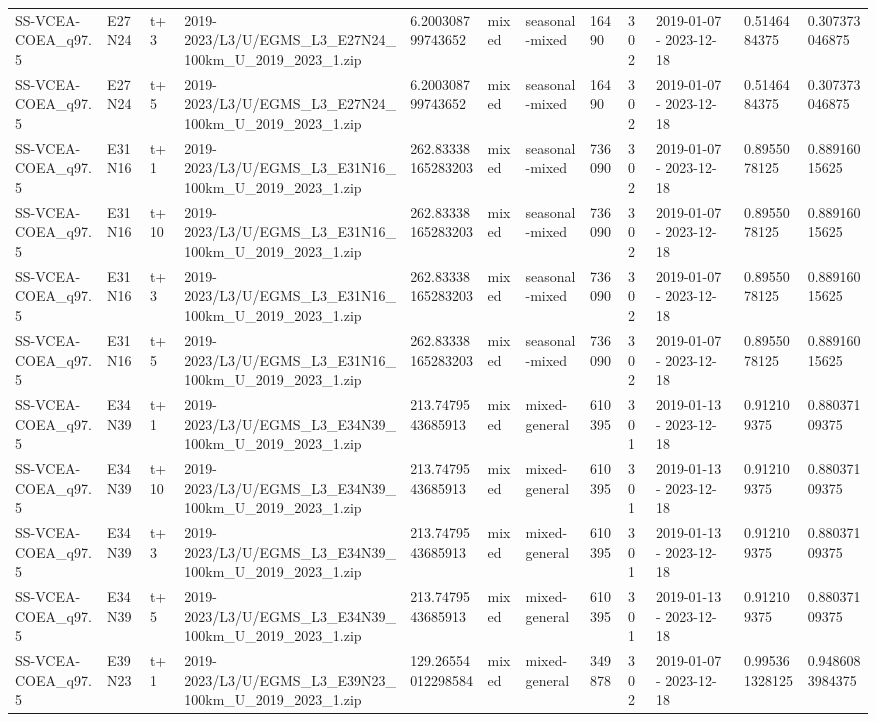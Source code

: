 \begin{landscape}
\begin{longtable}{llllllllllll}
SS-VCEA-COEA\_q97.5 & E27N24 & t+3 & 2019-2023/L3/U/EGMS\_L3\_E27N24\_100km\_U\_2019\_2023\_1.zip & 6.200308799743652 & mixed & seasonal-mixed & 16490 & 302 & 2019-01-07 - 2023-12-18 & 0.5146484375 & 0.307373046875 \\
SS-VCEA-COEA\_q97.5 & E27N24 & t+5 & 2019-2023/L3/U/EGMS\_L3\_E27N24\_100km\_U\_2019\_2023\_1.zip & 6.200308799743652 & mixed & seasonal-mixed & 16490 & 302 & 2019-01-07 - 2023-12-18 & 0.5146484375 & 0.307373046875 \\
SS-VCEA-COEA\_q97.5 & E31N16 & t+1 & 2019-2023/L3/U/EGMS\_L3\_E31N16\_100km\_U\_2019\_2023\_1.zip & 262.83338165283203 & mixed & seasonal-mixed & 736090 & 302 & 2019-01-07 - 2023-12-18 & 0.8955078125 & 0.88916015625 \\
SS-VCEA-COEA\_q97.5 & E31N16 & t+10 & 2019-2023/L3/U/EGMS\_L3\_E31N16\_100km\_U\_2019\_2023\_1.zip & 262.83338165283203 & mixed & seasonal-mixed & 736090 & 302 & 2019-01-07 - 2023-12-18 & 0.8955078125 & 0.88916015625 \\
SS-VCEA-COEA\_q97.5 & E31N16 & t+3 & 2019-2023/L3/U/EGMS\_L3\_E31N16\_100km\_U\_2019\_2023\_1.zip & 262.83338165283203 & mixed & seasonal-mixed & 736090 & 302 & 2019-01-07 - 2023-12-18 & 0.8955078125 & 0.88916015625 \\
SS-VCEA-COEA\_q97.5 & E31N16 & t+5 & 2019-2023/L3/U/EGMS\_L3\_E31N16\_100km\_U\_2019\_2023\_1.zip & 262.83338165283203 & mixed & seasonal-mixed & 736090 & 302 & 2019-01-07 - 2023-12-18 & 0.8955078125 & 0.88916015625 \\
SS-VCEA-COEA\_q97.5 & E34N39 & t+1 & 2019-2023/L3/U/EGMS\_L3\_E34N39\_100km\_U\_2019\_2023\_1.zip & 213.7479543685913 & mixed & mixed-general & 610395 & 301 & 2019-01-13 - 2023-12-18 & 0.912109375 & 0.88037109375 \\
SS-VCEA-COEA\_q97.5 & E34N39 & t+10 & 2019-2023/L3/U/EGMS\_L3\_E34N39\_100km\_U\_2019\_2023\_1.zip & 213.7479543685913 & mixed & mixed-general & 610395 & 301 & 2019-01-13 - 2023-12-18 & 0.912109375 & 0.88037109375 \\
SS-VCEA-COEA\_q97.5 & E34N39 & t+3 & 2019-2023/L3/U/EGMS\_L3\_E34N39\_100km\_U\_2019\_2023\_1.zip & 213.7479543685913 & mixed & mixed-general & 610395 & 301 & 2019-01-13 - 2023-12-18 & 0.912109375 & 0.88037109375 \\
SS-VCEA-COEA\_q97.5 & E34N39 & t+5 & 2019-2023/L3/U/EGMS\_L3\_E34N39\_100km\_U\_2019\_2023\_1.zip & 213.7479543685913 & mixed & mixed-general & 610395 & 301 & 2019-01-13 - 2023-12-18 & 0.912109375 & 0.88037109375 \\
SS-VCEA-COEA\_q97.5 & E39N23 & t+1 & 2019-2023/L3/U/EGMS\_L3\_E39N23\_100km\_U\_2019\_2023\_1.zip & 129.26554012298584 & mixed & mixed-general & 349878 & 302 & 2019-01-07 - 2023-12-18 & 0.995361328125 & 0.9486083984375 \\

\end{longtable}
\end{landscape}

